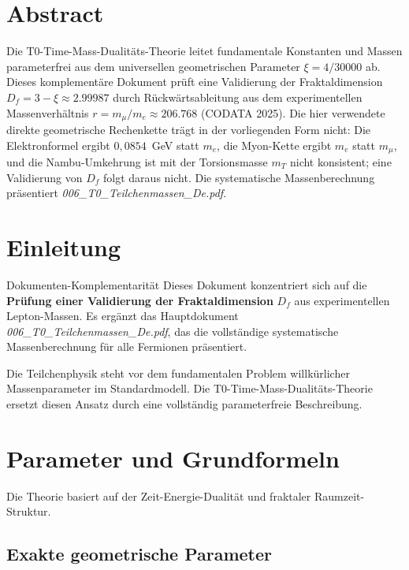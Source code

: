 \section*{Abstract}
		Die T0-Time-Mass-Dualitäts-Theorie leitet fundamentale Konstanten und Massen parameterfrei aus dem universellen geometrischen Parameter $\xi = 4/30000$ ab. Dieses komplementäre Dokument prüft eine Validierung der Fraktaldimension $D_f = 3 - \xi \approx 2.99987$ durch Rückwärtsableitung aus dem experimentellen Massenverhältnis $r = m_{\mu} / m_e \approx 206.768$ (CODATA 2025). Die hier verwendete direkte geometrische Rechenkette trägt in der vorliegenden Form nicht: Die Elektronformel ergibt $0{,}0854$~GeV statt $m_e$, die Myon-Kette ergibt $m_e$ statt $m_\mu$, und die Nambu-Umkehrung ist mit der Torsionsmasse $m_T$ nicht konsistent; eine Validierung von $D_f$ folgt daraus nicht. Die systematische Massenberechnung präsentiert \emph{006\_T0\_Teilchenmassen\_De.pdf}.

	
	
	\section{Einleitung}
	\label{sec:einfuehrung}
	
	\begin{important}{Dokumenten-Komplementarität}{}
		Dieses Dokument konzentriert sich auf die \textbf{Prüfung einer Validierung der Fraktaldimension} $D_f$ aus experimentellen Lepton-Massen. Es ergänzt das Hauptdokument \emph{006\_T0\_Teilchenmassen\_De.pdf}, das die vollständige systematische Massenberechnung für alle Fermionen präsentiert.
	\end{important}
	
	Die Teilchenphysik steht vor dem fundamentalen Problem willkürlicher Massenparameter im Standardmodell. Die T0-Time-Mass-Dualitäts-Theorie ersetzt diesen Ansatz durch eine vollständig parameterfreie Beschreibung.
	
	\section{Parameter und Grundformeln}
	\label{sec:parameter}
	
	Die Theorie basiert auf der Zeit-Energie-Dualität und fraktaler Raumzeit-Struktur.
	
	\subsection{Exakte geometrische Parameter}
	\label{subsec:exakte_parameter}
	
